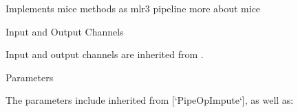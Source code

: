 \documentclass[letterpaper]{book}
\begin{document}
%
\begin{Description}\relax
Implements mice methods as mlr3 pipeline more about mice 
\end{Description}
%
\begin{Section}{Input and Output Channels}

Input and output channels are inherited from .
\end{Section}
%
\begin{Section}{Parameters}

The parameters include inherited from [`PipeOpImpute`], as well as: \\{}
\begin{itemize}


\end{itemize}
\end{Section}
\end{document}
